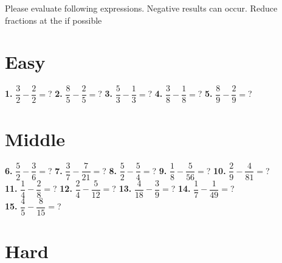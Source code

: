 \documentclass[a4paper]{article}
\begin{document}
\begin{Large}

Please evaluate following expressions. Negative results can occur. Reduce fractions at the if possible

\section* {Easy}
		
\textbf{1.} $\dfrac{3}{2} - \dfrac{2}{2} =$? \hspace{0.2cm}
\textbf{2.} $\dfrac{8}{5} - \dfrac{2}{5} =$? \hspace{0.2cm}
\textbf{3.} $\dfrac{5}{3} - \dfrac{1}{3} =$? \hspace{0.2cm}
\textbf{4.} $\dfrac{3}{8} - \dfrac{1}{8} =$? \hspace{0.2cm}
\textbf{5.} $\dfrac{8}{9} - \dfrac{2}{9} =$?

		
\section* {Middle}
		
\textbf{6.} $\dfrac{5}{2} - \dfrac{3}{6} =$? \hspace{0.2cm}
\textbf{7.} $\dfrac{3}{7} - \dfrac{7}{21} =$? \hspace{0.2cm}
\textbf{8.} $\dfrac{5}{2} - \dfrac{5}{4} =$? \hspace{0.2cm}
\textbf{9.} $\dfrac{1}{8} - \dfrac{5}{56} =$? \hspace{0.2cm}
\textbf{10.} $\dfrac{2}{9} - \dfrac{4}{81} =$? \\[1cm]
\textbf{11.} $\dfrac{1}{4} - \dfrac{2}{8}=$? \hspace{0.2cm}
\textbf{12.} $\dfrac{2}{4} - \dfrac{5}{12} =$? \hspace{0.2cm}
\textbf{13.} $\dfrac{4}{18} - \dfrac{3}{9} =$? \hspace{0.2cm}
\textbf{14.} $\dfrac{1}{7} - \dfrac{1}{49} =$? \hspace{0.2cm} \\[1cm]
\textbf{15.} $\dfrac{4}{5} - \dfrac{8}{15} =$?
		
\section* {Hard}


\end{Large}
\end{document}
